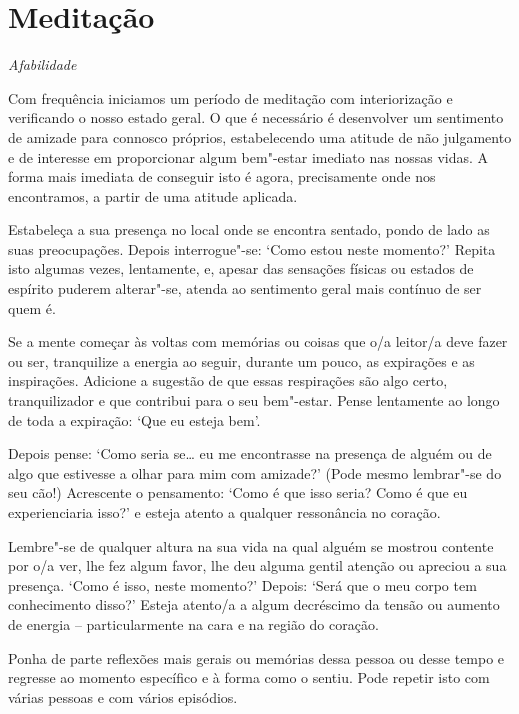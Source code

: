 \clearpage

\section[Meditação: afabilidade]{Meditação}

{\centering
\subSectionFont\selectfont
\textit{Afabilidade}
\par}

\bigskip

Com frequência iniciamos um período de meditação com interiorização e
verificando o nosso estado geral. O que é necessário é desenvolver um sentimento
de amizade para connosco próprios, estabelecendo uma atitude de não julgamento e
de interesse em proporcionar algum bem"-estar imediato nas nossas vidas. A forma
mais imediata de conseguir isto é agora, precisamente onde nos encontramos, a
partir de uma atitude aplicada.

Estabeleça a sua presença no local onde se encontra sentado, pondo de lado as
suas preocupações. Depois interrogue"-se: `Como estou neste momento?' Repita isto
algumas vezes, lentamente, e, apesar das sensações físicas ou estados de
espírito puderem alterar"-se, atenda ao sentimento geral mais contínuo de ser
quem é.

Se a mente começar às voltas com memórias ou coisas que o/a leitor/a deve fazer
ou ser, tranquilize a energia ao seguir, durante um pouco, as expirações e as
inspirações. Adicione a sugestão de que essas respirações são algo certo,
\mbox{tranquilizador} e que contribui para o seu bem"-estar. Pense lentamente ao longo
de toda a expiração: `Que eu esteja bem'.

\enlargethispage{2\baselineskip}

Depois pense: `Como seria se\ldots{} eu me encontrasse na presença de alguém ou de
algo que estivesse a olhar para mim com amizade?' (Pode mesmo lembrar"-se do seu
cão!) Acrescente o pensamento: `Como é que isso seria? Como é que eu
experienciaria isso?' e esteja atento a qualquer ressonância no coração.

Lembre"-se de qualquer altura na sua vida na qual alguém se mostrou contente por
o/a ver, lhe fez algum favor, lhe deu alguma gentil atenção ou apreciou a sua
presença. `Como é isso, neste momento?' Depois: `Será que o meu corpo tem
conhecimento disso?' Esteja atento/a a algum decréscimo da tensão ou aumento de
energia -- particularmente na cara e na região do coração.

Ponha de parte reflexões mais gerais ou memórias dessa pessoa ou desse tempo e
regresse ao momento específico e à forma como o sentiu. Pode repetir isto com
várias pessoas e com vários episódios.

